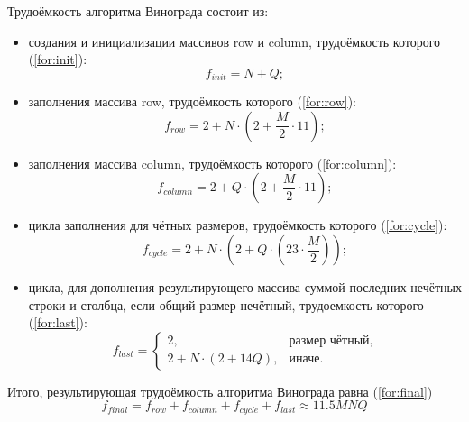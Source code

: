 Трудоёмкость алгоритма Винограда состоит из:
\begin{itemize}
	\item создания и инициализации массивов row и column, трудоёмкость которого (\ref{for:init}):
	\begin{equation}
		\label{for:init}
		f_{init} = N + Q;
	\end{equation}
	
	\item заполнения массива row, трудоёмкость которого (\ref{for:row}):
	\begin{equation}
		\label{for:row}
		f_{row} = 2 + N \cdot (2 + \frac{M}{2} \cdot 11);
	\end{equation}
	
	\item заполнения массива column, трудоёмкость которого (\ref{for:column}):
	\begin{equation}
		\label{for:column}
		f_{column} = 2 + Q \cdot (2 + \frac{M}{2} \cdot 11);
	\end{equation}
	
	\item цикла заполнения для чётных размеров, трудоёмкость которого (\ref{for:cycle}):
	\begin{equation}
		\label{for:cycle}
		f_{cycle} = 2 + N \cdot (2 + Q \cdot (23 \cdot \frac{M}{2}));		
	\end{equation}
	
	\item цикла, для дополнения результирующего массива суммой последних нечётных строки и столбца, если общий размер нечётный, трудоемкость которого (\ref{for:last}):
	\begin{equation}
		\label{for:last}
		f_{last} = \begin{cases}
			2, & \text{размер чётный,}\\
			2 + N \cdot (2 + 14Q), & \text{иначе.}
		\end{cases}
	\end{equation}
\end{itemize}



Итого, результирующая трудоёмкость алгоритма Винограда равна (\ref{for:final})
\begin{equation}
	\label{for:final}
	f_{final} = f_{row} + f_{column} + f_{cycle} + f_{last} \approx 11.5MNQ
\end{equation}